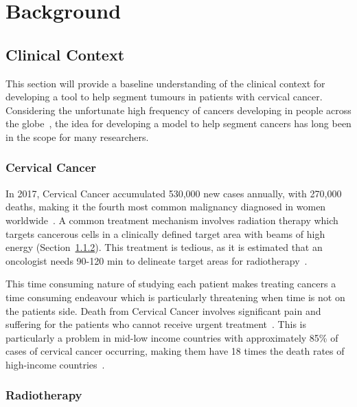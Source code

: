 \documentclass[12pt,twoside]{report}
\begin{document}
\chapter{Background}\label{sect:background}

\section{Clinical Context}\label{sect:clinical-context}

This section will provide a baseline understanding of the clinical context for developing a tool to help segment tumours in patients with cervical cancer. Considering the unfortunate high frequency of cancers developing in people across the globe~\cite{cervical-cancer-epidemic}, the idea for developing a model to help segment cancers has long been in the scope for many researchers.

\subsection{Cervical Cancer}\label{sect:cervical-cancer}

In 2017, Cervical Cancer accumulated 530,000 new cases annually, with 270,000 deaths, making it the fourth most common malignancy diagnosed in women worldwide~\cite{cervical-cancer-epidemic}. A common treatment mechanism involves radiation therapy which targets cancerous cells in a clinically defined target area with beams of high energy (Section~\ref{sect:radiotherapy}). This treatment is tedious, as it is estimated that an oncologist needs 90-120 min to delineate target areas for radiotherapy~\cite{LIU2020184}.

This time consuming nature of studying each patient makes treating cancers a time consuming endeavour which is particularly threatening when time is not on the patients side. Death from Cervical Cancer involves significant pain and suffering for the patients who cannot receive urgent treatment~\cite{cervical-cancer-epidemic}. This is particularly a problem in mid-low income countries with approximately 85\% of cases of cervical cancer occurring, making them have 18 times the death rates of high-income countries~\cite{cervical-cancer-epidemic}. 

\subsection{Radiotherapy}\label{sect:radiotherapy}
\end{document}
